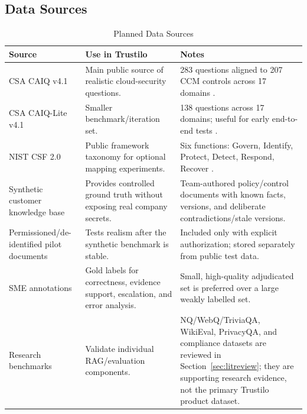 \documentclass[11pt,journal,onecolumn]{IEEEtran}
\begin{document}
\subsection{Data Sources}
\begin{table}[H]
\centering
\caption{Planned Data Sources}
\small
\begin{tabularx}{\textwidth}{L{0.24\textwidth}Y L{0.21\textwidth}}
\toprule
\textbf{Source} & \textbf{Use in Trustilo} & \textbf{Notes} \\
\midrule
CSA CAIQ v4.1 & Main public source of realistic cloud-security questions. & 283 questions aligned to 207 CCM controls across 17 domains \cite{csa2026ccm,csa2026guide}. \\
CSA CAIQ-Lite v4.1 & Smaller benchmark/iteration set. & 138 questions across 17 domains; useful for early end-to-end tests \cite{csa2026lite}. \\
NIST CSF 2.0 & Public framework taxonomy for optional mapping experiments. & Six functions: Govern, Identify, Protect, Detect, Respond, Recover \cite{nist2024csf,nist2024news}. \\
Synthetic customer knowledge base & Provides controlled ground truth without exposing real company secrets. & Team-authored policy/control documents with known facts, versions, and deliberate contradictions/stale versions. \\
Permissioned/de-identified pilot documents & Tests realism after the synthetic benchmark is stable. & Included only with explicit authorization; stored separately from public test data. \\
SME annotations & Gold labels for correctness, evidence support, escalation, and error analysis. & Small, high-quality adjudicated set is preferred over a large weakly labelled set. \\
Research benchmarks & Validate individual RAG/evaluation components. & NQ/WebQ/TriviaQA, WikiEval, PrivacyQA, and compliance datasets are reviewed in Section~\ref{sec:litreview}; they are supporting research evidence, not the primary Trustilo product dataset. \\
\bottomrule
\end{tabularx}
\end{table}
\end{document}
